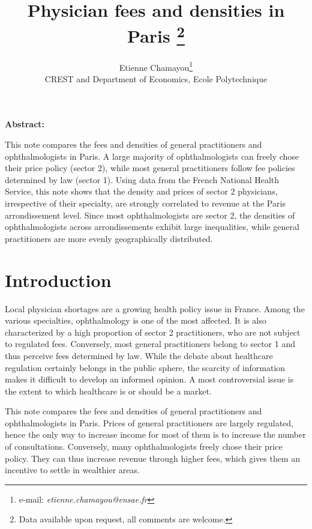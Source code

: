 \documentclass[11pt]{article}
\begin{document}
\title{Physician fees and densities in Paris%
\thanks{Data available upon request, all comments are welcome.%
}}

\author{Etienne Chamayou\thanks{e-mail:
\textit{etienne.chamayou@ensae.fr}}\medskip\\{\normalsize CREST and Department of Economics, Ecole Polytechnique }}
\maketitle

\sloppy%

\onehalfspacing

\textbf{Abstract:}

This note compares the fees and densities of general practitioners and ophthalmologists in Paris. A large majority of ophthalmologists can freely chose their price policy (sector 2), while most general practitioners follow fee policies determined by law (sector 1). Using data from the French National Health Service, this note shows that the density and prices of sector 2 physicians, irrespective of their specialty, are strongly correlated to revenue at the Paris arrondissement level. Since most ophthalmologists are sector 2, the densities of ophthalmologists across arrondissements exhibit large inequalities, while general practitioners are more evenly geographically distributed.

\strut

\pagebreak%
\doublespacing

\section{Introduction}

Local physician shortages are a growing health policy issue in France. Among the various specialties, ophthalmology is one of the most affected. It is also characterized by a high proportion of sector 2 practitioners, who are not subject to regulated fees. Conversely, most general practitioners belong to sector 1 and thus perceive fees determined by law. While the debate about healthcare regulation certainly belongs in the public sphere, the scarcity of information makes it difficult to develop an informed opinion. A most controversial issue is the extent to which healthcare is or should be a market.

This note compares the fees and densities of general practitioners and ophthalmologists in Paris. Prices of general practitioners are largely regulated, hence the only way to increase income for most of them is to increase the number of consultations. Conversely, many ophthalmologists freely chose their price policy. They can thus increase revenue through higher fees, which gives them an incentive to settle in wealthier areas.
\end{document}

